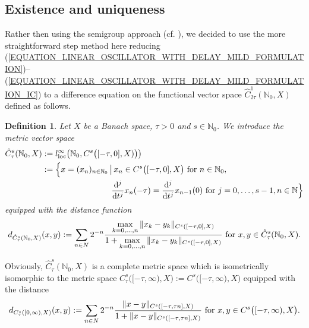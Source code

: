 \documentclass[12pt]{article}
\newtheorem{definition}[theorem]{Definition}
\numberwithin{equation}{section}
\numberwithin{equation}{section}
\begin{document}
	\subsection{Existence and uniqueness}
	Rather then using the semigroup approach (cf. \cite[Chapter 2]{HaLu1993}),
	we decided to use the more straightforward step method here
	reducing (\ref{EQUATION_LINEAR_OSCILLATOR_WITH_DELAY_MILD_FORMULATION})--(\ref{EQUATION_LINEAR_OSCILLATOR_WITH_DELAY_MILD_FORMULATION_IC})
	to a difference equation on the functional vector space $\hat{C}^{1}_{2\tau}(\mathbb{N}_{0}, X)$ defined as follows.
	\begin{definition}
		Let $X$ be a Banach space, $\tau > 0$ and $s \in \mathbb{N}_{0}$.
		We introduce the metric vector space
		\begin{equation}
			\begin{split}
				\hat{C}^{s}_{\tau}(\mathbb{N}_{0}, X) &:= l^{\infty}_{\mathrm{loc}}\big(\mathbb{N}_{0}, C^{s}\big([-\tau, 0], X)\big)\big) \\
				&:= \Big\{x = (x_{n})_{n \in \mathbb{N}_{0}} \,\big|\, x_{n} \in C^{s}\big([-\tau, 0], X\big) \text{ for } n \in \mathbb{N}_{0}, \\
				&\phantom{:= \Big\{x = (x_{n})_{n \in \mathbb{N}_{0}} \,\big|\,} \frac{\mathrm{d}^{j}}{\mathrm{d}t^{j}} x_{n}(-\tau) = \frac{\mathrm{d}^{j}}{\mathrm{d}t^{j}} x_{n-1}(0) \text{ for } j = 0, \dots, s - 1, n \in \mathbb{N}\Big\}
			\end{split}
			\notag
		\end{equation}
		equipped with the distance function
		\begin{equation}
			d_{\hat{C}_{\tau}^{s}(\mathbb{N}_{0}, X)}(x, y) :=
			\sum_{n \in N} 2^{-n}
			\frac{\max\limits^{}_{k = 0, \dots, n} \|x_{k} - y_{k}\|_{C^{s}([-\tau, 0], X)}}{1 + \max\limits^{}_{k = 0, \dots, n} \|x_{k} - y_{k}\|_{C^{s}([-\tau, 0], X)}}
			\text{ for } x, y \in \hat{C}_{\tau}^{s}(\mathbb{N}_{0}, X). \notag
		\end{equation}
	\end{definition}
	Obviously, $\hat{C}^{s}_{\tau}(\mathbb{N}_{0}, X)$ is a complete metric space which is isometrically isomorphic 
	to the metric space $C^{s}_{\tau}\big([-\tau, \infty), X\big) := C^{s}\big([-\tau, \infty), X\big)$ equipped with the distance
	\begin{equation}
		d_{C^{s}_{\tau}([0, \infty), X)}(x, y) :=
		\sum_{n \in N} 2^{-n}
		\frac{\|x - y\|_{C^{s}([-\tau, \tau n], X)}}
		{1 + \|x - y\|_{C^{s}([-\tau, \tau n], X)}} \text{ for } x, y \in C^{s}\big([-\tau, \infty), X\big). \notag
	\end{equation}
\end{document}
